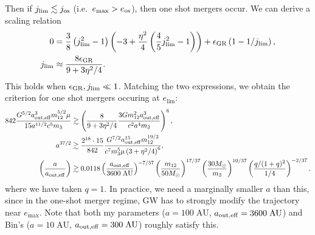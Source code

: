 \documentclass[11pt,
        usenames, %
        dvipsnames %
    ]{article}
\newcommand*{\p}[1]{\left(#1\right)}
\begin{document}
\begin{itemize}
        Then if $j_{\lim} \lesssim j_{\rm os}$ (i.e.\ $e_{\max} > e_{\rm os}$),
        then one shot mergers occur. We can derive a scaling relation
        \begin{align}
            0 &= \frac{3}{8}\p{j_{\lim}^2 - 1}\p{-3 + \frac{\eta^2}{4}
                \p{\frac{4}{5}j_{\lim}^2 - 1}} + \epsilon_{\rm GR}
                    \p{1 - 1/j_{\lim}},\\
            j_{\lim} &\approx \frac{8\epsilon_{\rm GR}}{9 + 3\eta^2/4}.
        \end{align}
        This holds when $\epsilon_{\rm GR}, j_{\lim} \ll 1$. Matching the two
        expressions, we obtain the criterion for one shot mergers occuring at
        $e_{\lim}$:
        \begin{align}
            842 \frac{G^{5/2}a_{\rm out, eff}^3 m_{12}^{5/2}\mu}{
                15a^{11/2}c^5 m_3}
                &\gtrsim \p{\frac{8}{9 + 3\eta^2/4}
                    \frac{3Gm_{12}^2a_{\rm out, eff}^3}{c^2a^4m_3}}^6,\\
            a^{37/2} &\gtrsim \frac{2^{18} \cdot 15}{842} \frac{G^{7/2}a_{\rm
                out, eff}^{15} m_{12}^{19/2}}{c^7 m_3^5 \mu \p{3 + \eta^2/4}^6}
                ,\\
            \p{\frac{a}{a_{\rm out, eff}}} &\gtrsim
                0.0118
                \p{\frac{a_{\rm out, eff}}{3600\;\mathrm{AU}}}^{-7/37}
                \p{\frac{m_{12}}{50M_{\odot}}}^{17/37}
                \p{\frac{30M_{\odot}}{m_3}}^{10/37}
                \p{\frac{q / (1 + q)^2}{1/4}}^{-2/37}.
        \end{align}
        where we have taken $q = 1$. In practice, we need a marginally smaller
        $a$ than this, since in the one-shot merger regime, GW has to strongly
        modify the trajectory near $e_{\max}$. Note that both my parameters ($a
        = 100\;\mathrm{AU}$, $a_{\rm out, eff} = 3600\;\mathrm{AU}$) and Bin's
        ($a = 10\;\mathrm{AU}$, $a_{\rm out, eff} = 300\;\mathrm{AU}$) roughly
        satisfy this.


\end{itemize}
\end{document}
